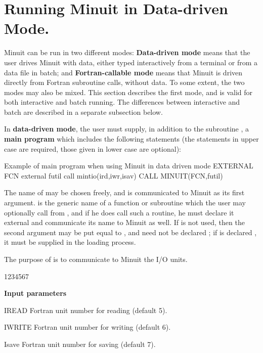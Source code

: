 \section{Running Minuit in Data-driven Mode.}

Minuit can be run in two different modes:
{\bf Data-driven mode}
means that the user drives Minuit with data, either typed
interactively from a terminal or from a data file in batch; and
{\bf Fortran-callable mode}
means that Minuit is driven directly from Fortran subroutine
calls, without data.
To some extent, the two modes may also be mixed.
This section describes the first mode, and is valid for both
interactive and batch running.
The differences between interactive and batch are described in
a separate subsection below.
 
In {\bf data-driven mode}, the user must supply,
in addition to the subroutine , a
{\bf main program} which includes the following
statements (the statements in upper case are required, those
given in lower case are optional):

\begin{XMPt}{Example of main program when using Minuit in data driven mode}
      EXTERNAL FCN
      external futil
      call mintio(ird,iwr,isav)
      CALL MINUIT(FCN,futil)
\end{XMPt}

The name of  may be chosen freely, and is communicated
to Minuit as its first argument.
 is the generic name of a function or subroutine which the
user may optionally call from , and if he does call such
a routine, he must declare it external and communicate its
name to Minuit as well.  If  is not used, then the second
argument may be put equal to , 
and need not be declared ; if  is
declared , it must be supplied in the loading process.

\newpage


\medskip\Action
The purpose of  is to communicate to Minuit the I/O units.

\begin{DLtt}{1234567}
\item[{\rm\bf Input parameters}] \mbox{}
\item[IREAD]  Fortran unit number for reading (default 5).
\item[IWRITE] Fortran unit number for writing (default 6).
\item[Isave]  Fortran unit number for saving (default 7).
\end{DLtt}

